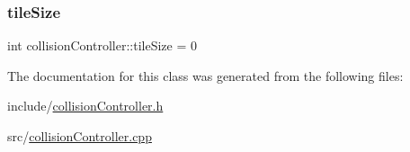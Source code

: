 \subsubsection{\texorpdfstring{tile\+Size}{tileSize}}
{\footnotesize\ttfamily int collision\+Controller\+::tile\+Size = 0\hspace{0.3cm}{\ttfamily [private]}}



The documentation for this class was generated from the following files\+:\begin{DoxyCompactItemize}
\item 
include/\hyperlink{collisionController_8h}{collision\+Controller.\+h}\item 
src/\hyperlink{collisionController_8cpp}{collision\+Controller.\+cpp}\end{DoxyCompactItemize}
